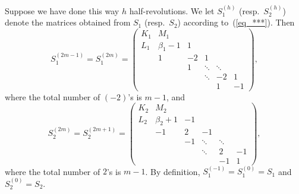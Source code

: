 \documentclass[pdftex]{sigma}
\begin{document}
Suppose we have done this way $h$ half-revolutions. We let $S_1^{(h)}$ (resp.~$S_2^{(h)}$) denote the matrices obtained from $S_1$ (resp.~$S_2$) according to~(\ref{eq_***}). Then
\begin{equation*}
S_1^{(2m-1)} = S_1^{(2m)} = \left( \begin{array}{cccccc}
K_1 & M_1 & {} & {} & {} & {} \\ L_1 & \beta_1-1 & 1 & {} & {} & {} \\ {} & 1 & -2 & 1 & {} & {} \\ {} & {} & 1 & \ddots & \ddots & {} \\
{} & {} & {} & \ddots & -2 & 1 \\ {} & {} & {} & {} & 1 & -1 \end{array} \right), %
\end{equation*}
where the total number of $(-2)$'s is $m-1$, and
\begin{equation*}
S_2^{(2m)} = S_2^{(2m+1)} = \left( \begin{array}{cccccc}
K_2 & M_2 & {} & {} & {} & {} \\ L_2 & \beta_2+1 & -1 & {} & {} & {} \\ {} & -1 & 2 & -1 & {} & {} \\ {} & {} & -1 & \ddots & \ddots & {} \\
{} & {} & {} & \ddots & 2 & -1 \\ {} & {} & {} & {} & -1 & 1 \end{array} \right), %
\end{equation*}
where the total number of $2$'s is $m-1$. By def\/inition, $S_1^{(-1)} = S_1^{(0)} = S_1$ and $S_2^{(0)} = S_2$.
\end{document}
